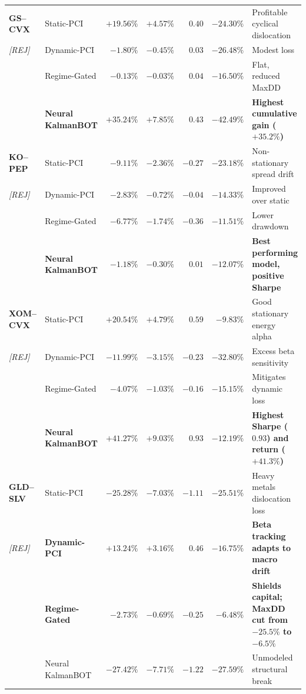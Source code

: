 \documentclass[11pt, a4paper]{article}
\begin{document}
\begin{center}
\begin{longtable}{llrrrrp{4.8cm}}
\midrule
\textbf{GS--CVX} & Static-PCI & $+19.56\%$ & $+4.57\%$ & $0.40$ & $-24.30\%$ & Profitable cyclical dislocation \\
\small\textit{[REJ]} & Dynamic-PCI & $-1.80\%$ & $-0.45\%$ & $0.03$ & $-26.48\%$ & Modest loss \\
 & Regime-Gated & $-0.13\%$ & $-0.03\%$ & $0.04$ & $-16.50\%$ & Flat, reduced MaxDD \\
 & \textbf{Neural KalmanBOT} & $\mathbf{+35.24\%}$ & $\mathbf{+7.85\%}$ & $\mathbf{0.43}$ & $\mathbf{-42.49\%}$ & \textbf{Highest cumulative gain ($+35.2\%$)} \\
\midrule
\textbf{KO--PEP} & Static-PCI & $-9.11\%$ & $-2.36\%$ & $-0.27$ & $-23.18\%$ & Non-stationary spread drift \\
\small\textit{[REJ]} & Dynamic-PCI & $-2.83\%$ & $-0.72\%$ & $-0.04$ & $-14.33\%$ & Improved over static \\
 & Regime-Gated & $-6.77\%$ & $-1.74\%$ & $-0.36$ & $-11.51\%$ & Lower drawdown \\
 & \textbf{Neural KalmanBOT} & $\mathbf{-1.18\%}$ & $\mathbf{-0.30\%}$ & $\mathbf{0.01}$ & $\mathbf{-12.07\%}$ & \textbf{Best performing model, positive Sharpe} \\
\midrule
\textbf{XOM--CVX} & Static-PCI & $+20.54\%$ & $+4.79\%$ & $0.59$ & $-9.83\%$ & Good stationary energy alpha \\
\small\textit{[REJ]} & Dynamic-PCI & $-11.99\%$ & $-3.15\%$ & $-0.23$ & $-32.80\%$ & Excess beta sensitivity \\
 & Regime-Gated & $-4.07\%$ & $-1.03\%$ & $-0.16$ & $-15.15\%$ & Mitigates dynamic loss \\
 & \textbf{Neural KalmanBOT} & $\mathbf{+41.27\%}$ & $\mathbf{+9.03\%}$ & $\mathbf{0.93}$ & $\mathbf{-12.19\%}$ & \textbf{Highest Sharpe ($0.93$) and return ($+41.3\%$)} \\
\midrule
\textbf{GLD--SLV} & Static-PCI & $-25.28\%$ & $-7.03\%$ & $-1.11$ & $-25.51\%$ & Heavy metals dislocation loss \\
\small\textit{[REJ]} & \textbf{Dynamic-PCI} & $\mathbf{+13.24\%}$ & $\mathbf{+3.16\%}$ & $\mathbf{0.46}$ & $\mathbf{-16.75\%}$ & \textbf{Beta tracking adapts to macro drift} \\
 & \textbf{Regime-Gated} & $\mathbf{-2.73\%}$ & $\mathbf{-0.69\%}$ & $\mathbf{-0.25}$ & $\mathbf{-6.48\%}$ & \textbf{Shields capital; MaxDD cut from $-25.5\%$ to $-6.5\%$} \\
 & Neural KalmanBOT & $-27.42\%$ & $-7.71\%$ & $-1.22$ & $-27.59\%$ & Unmodeled structural break \\

\end{longtable}
\end{center}
\end{document}
